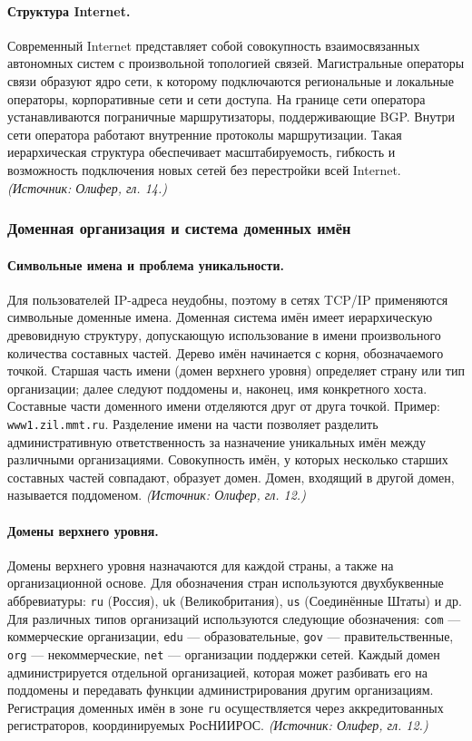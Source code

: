 \documentclass[a4paper,12pt]{article}
\begin{document}
\paragraph{Структура Internet.}
Современный Internet представляет собой совокупность взаимосвязанных автономных систем с произвольной топологией связей. Магистральные операторы связи образуют ядро сети, к которому подключаются региональные и локальные операторы, корпоративные сети и сети доступа. На границе сети оператора устанавливаются пограничные маршрутизаторы, поддерживающие BGP. Внутри сети оператора работают внутренние протоколы маршрутизации. Такая иерархическая структура обеспечивает масштабируемость, гибкость и возможность подключения новых сетей без перестройки всей Internet.
\textit{(Источник: Олифер, гл. 14.)}

\subsubsection{Доменная организация и система доменных имён}

\paragraph{Символьные имена и проблема уникальности.}
Для пользователей IP-адреса неудобны, поэтому в сетях TCP/IP применяются символьные доменные имена. Доменная система имён имеет иерархическую древовидную структуру, допускающую использование в имени произвольного количества составных частей. Дерево имён начинается с корня, обозначаемого точкой. Старшая часть имени (домен верхнего уровня) определяет страну или тип организации; далее следуют поддомены и, наконец, имя конкретного хоста. Составные части доменного имени отделяются друг от друга точкой. Пример: \texttt{www1.zil.mmt.ru}. Разделение имени на части позволяет разделить административную ответственность за назначение уникальных имён между различными организациями. Совокупность имён, у которых несколько старших составных частей совпадают, образует домен. Домен, входящий в другой домен, называется поддоменом.
\textit{(Источник: Олифер, гл. 12.)}

\paragraph{Домены верхнего уровня.}
Домены верхнего уровня назначаются для каждой страны, а также на организационной основе. Для обозначения стран используются двухбуквенные аббревиатуры: \texttt{ru} (Россия), \texttt{uk} (Великобритания), \texttt{us} (Соединённые Штаты) и др. Для различных типов организаций используются следующие обозначения: \texttt{com} — коммерческие организации, \texttt{edu} — образовательные, \texttt{gov} — правительственные, \texttt{org} — некоммерческие, \texttt{net} — организации поддержки сетей. Каждый домен администрируется отдельной организацией, которая может разбивать его на поддомены и передавать функции администрирования другим организациям. Регистрация доменных имён в зоне \texttt{ru} осуществляется через аккредитованных регистраторов, координируемых РосНИИРОС.
\textit{(Источник: Олифер, гл. 12.)}
\end{document}
